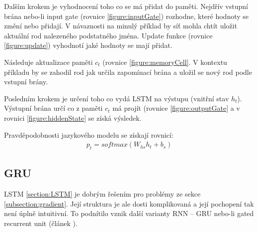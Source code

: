 Dalším krokem je vyhodnocení toho co se má přidat do paměti. Nejdřív vstupní brána nebo-li input gate (rovnice \ref{figure:inputGate}) rozhodne, které hodnoty se změní nebo přidají. V návaznosti na minulý příklad by síť mohla chtít uložit aktuální rod nalezeného podstatného jména. Update funkce (rovnice \ref{figure:update}) vyhodnotí jaké hodnoty se mají přidat. 

Následuje aktualizace paměti $c_t$ (rovnice \ref{figure:memoryCell}. V kontextu příkladu by se zahodil rod jak určila zapomínací brána a uložil se nový rod podle vstupní brány.

Posledním krokem je určení toho co vydá LSTM na výstupu (vnitřní stav $h_t$). Výstupní brána určí co z paměti $c_t$ má projít (rovnice \ref{figure:outputGate} a v rovnici \ref{figure:hiddenState} se získá výsledek. 

Pravděpodobnosti jazykového modelu se získají rovnicí:
\begin{align}
    p_t = softmax(W_{hs}h_{t} + b_{s})
\end{align}


\begin{figure}
    \begin{center}
    \end{center}
	\caption{}
	\label{img:LSTM}
\end{figure}



\subsection{GRU}\label{section:GRU}
LSTM \ref{section:LSTM} je dobrým řešením pro problémy ze sekce \ref{subsection:gradient}. Její struktura je ale dosti komplikovaná a její pochopení tak není úplně intuitivní. To podnítilo vznik další varianty RNN -- GRU nebo-li gated recurrent unit (článek \cite{GRU}).

